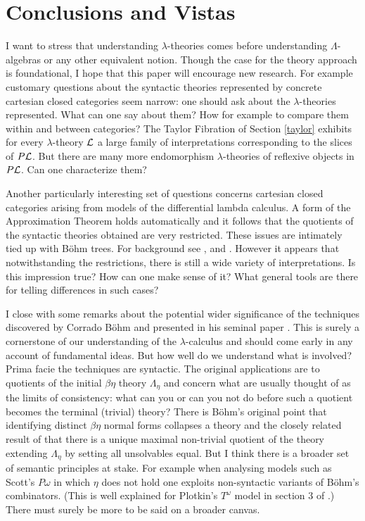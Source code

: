 \documentclass[12pt, amstex, amssymb]{article}
\newcommand{\mcat}{\cal}
\begin{document}
\section{Conclusions and Vistas}

 
I want to stress that
understanding $\lambda$-theories comes before 
understanding $\Lambda$-algebras or any other equivalent notion.
Though the case for the theory approach is foundational, I hope that 
this paper
will encourage new research.
For example customary questions about the syntactic
theories represented by concrete 
cartesian closed categories seem narrow: one should ask 
about the $\lambda$-theories represented. What can one say about
them? How for example to compare them within and between categories?
The Taylor Fibration of Section
\ref{taylor} exhibits for every $\lambda$-theory $\mcat L$
a large family of interpretations corresponding to the
slices of $P{\mcat L}$. But there are many more endomorphism
$\lambda$-theories of reflexive objects in
$P{\mcat L}$. Can one characterize them?

Another particularly interesting set of questions concerns
cartesian closed categories arising from models of the differential lambda
calculus. A form of the Approximation
Theorem holds automatically and it follows that the quotients of
the syntactic theories obtained are very restricted. 
These issues are intimately tied up with B\"{o}hm trees.
For background see \cite{ER03}, \cite{ER06} and \cite{Car11}.
However it appears that notwithstanding the 
restrictions, there is still a wide variety of interpretations.
Is this impression true? How can one make sense of it? 
What general tools are there for telling
differences in such cases?

I close with some remarks about the potential
wider significance of the techniques
discovered by Corrado B\"{o}hm and presented in his
seminal paper \cite{Bohm68}. This is surely a cornerstone of our understanding
of the $\lambda$-calculus and should come early in any account
of fundamental ideas. But how well do we understand what is involved?
Prima facie the techniques are syntactic. The original applications are to 
quotients of the initial $\beta\eta$ theory $\Lambda_{\eta}$ and concern
what are usually thought of as the limits of consistency: what can you or 
can you not do before such a quotient becomes the terminal 
(trivial) theory? There is B\"{o}hm's original point that
identifying distinct $\beta\eta$ normal forms collapses a theory
and the closely related result of \cite{Hyl76} that there is a unique
maximal non-trivial quotient of the theory extending  $\Lambda_{\eta}$
by setting all unsolvables equal. But I think there is a broader set
of semantic principles at stake. For example when analysing models such as 
Scott's $P\omega$ in which $\eta$ does not hold one exploits
non-syntactic variants of B\"{o}hm's combinators. (This is well
explained for Plotkin's
$T^{\omega}$ model
in section 3 of \cite{BL80}.) 
There must surely be more to be said on a broader 
canvas.
\end{document}
